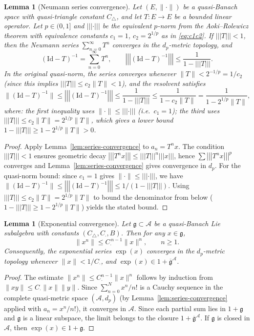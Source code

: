 \documentclass[10pt]{amsart}
\newtheorem{lemma}[theorem]{Lemma}
\theoremstyle{definition}
\theoremstyle{remark}
\numberwithin{equation}{section}
\newcommand{\Id}{\mathrm{Id}}
\newcommand{\Ctri}{C_{\triangle}}    %
\newcommand{\Cmult}{C_{\cdot}}       %
\newcommand{\Cbracket}{B}            %
\newcommand{\pnorm}[1]{\left\vert\!\left\vert\!\left\vert #1 \right\vert\!\right\vert\!\right\vert} %
\begin{document}
\begin{lemma}[Neumann series convergence]\label{lem:neumann}
Let $(E,\|\cdot\|)$ be a quasi-Banach space with quasi-triangle constant $\Ctri$, and let
$T:E\to E$ be a bounded linear operator.  Let $p\in(0,1]$ and $\pnorm{\cdot}$ be the
equivalent $p$-norm from the Aoki--Rolewicz theorem with equivalence constants $c_1 = 1$,
$c_2 = 2^{1/p}$ as in \eqref{eq:c1c2}.
If $\pnorm{T} < 1$, then the Neumann series
$\sum_{n=0}^\infty T^n$ converges in the $d_p$-metric topology, and
\[
  (\Id - T)^{-1} = \sum_{n=0}^\infty T^n, \qquad
  \pnorm{(\Id - T)^{-1}} \le \frac{1}{1 - \pnorm{T}}.
\]
In the original quasi-norm, the series converges whenever $\|T\| < 2^{-1/p} = 1/c_2$
(since this implies $\pnorm{T} \le c_2\|T\| < 1$), and the resolvent satisfies
\[
  \bigl\|(\Id - T)^{-1}\bigr\| \le \pnorm{(\Id - T)^{-1}} \le \frac{1}{1 - \pnorm{T}}
  \le \frac{1}{1 - c_2\|T\|} = \frac{1}{1 - 2^{1/p}\|T\|},
\]
where: the first inequality uses $\|\cdot\| \le \pnorm{\cdot}$ (i.e.\ $c_1 = 1$);
the third uses $\pnorm{T} \le c_2\|T\| = 2^{1/p}\|T\|$, which gives a lower bound
$1 - \pnorm{T} \ge 1 - 2^{1/p}\|T\| > 0$.
\end{lemma}

\begin{proof}
Apply Lemma~\ref{lem:series-convergence} to $a_n = T^n x$.  The condition $\pnorm{T} < 1$
ensures geometric decay $\pnorm{T^n x} \le \pnorm{T}^n \pnorm{x}$, hence
$\sum \pnorm{T^n x}^p$ converges and Lemma~\ref{lem:series-convergence} gives convergence
in $d_p$.  For the quasi-norm bound: since $c_1 = 1$ gives $\|\cdot\| \le \pnorm{\cdot}$,
we have $\|(\Id-T)^{-1}\| \le \pnorm{(\Id-T)^{-1}} \le 1/(1-\pnorm{T})$.
Using $\pnorm{T} \le c_2\|T\| = 2^{1/p}\|T\|$ to bound the denominator from below
($1 - \pnorm{T} \ge 1 - 2^{1/p}\|T\|$) yields the stated bound.
\end{proof}

\begin{lemma}[Exponential convergence]\label{lem:expbound}
Let $\mathfrak{g}\subset\mathcal{A}$ be a quasi-Banach Lie subalgebra with constants
$(\Ctri,\Cmult,\Cbracket)$.  Then for any $x\in\mathfrak{g}$,
\[
  \|x^n\|\le \Cmult^{\,n-1}\|x\|^n, \qquad n\ge 1.
\]
Consequently, the exponential series $\exp(x)$ converges in the $d_p$-metric topology
whenever $\|x\|<1/\Cmult$, and $\exp(x)\in 1+\overline{\mathfrak{g}}^{\mathcal{A}}$.
\end{lemma}

\begin{proof}
The estimate $\|x^n\| \le \Cmult^{n-1}\|x\|^n$ follows by induction from $\|xy\|\le \Cmult\|x\|\|y\|$.
Since $\sum_{n=0}^N x^n/n!$ is a Cauchy sequence in the complete quasi-metric space
$(\mathcal{A}, d_p)$ (by Lemma~\ref{lem:series-convergence} applied with
$a_n = x^n/n!$), it converges in $\mathcal{A}$.  Since each partial sum lies in
$1+\mathfrak{g}$ and $\mathfrak{g}$ is a linear subspace, the limit belongs to the closure
$1+\overline{\mathfrak{g}}^{\mathcal{A}}$.  If $\mathfrak{g}$ is closed in $\mathcal{A}$,
then $\exp(x)\in 1+\mathfrak{g}$.
\end{proof}
\end{document}
